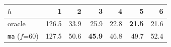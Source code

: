 \begin{tabular}{@{}lrrrrrr@{}}
\toprule
$h$ & 1 & 2 & 3 & 4 & 5 & 6 \\
\midrule
oracle & 126.5 & 33.9 & 25.9 & 22.8 & \textbf{21.5} & 21.6 \\
\texttt{ma} ($f$=60) & 127.5 & 50.6 & \textbf{45.9} & 46.8 & 49.7 & 52.4 \\
\bottomrule
\end{tabular}
